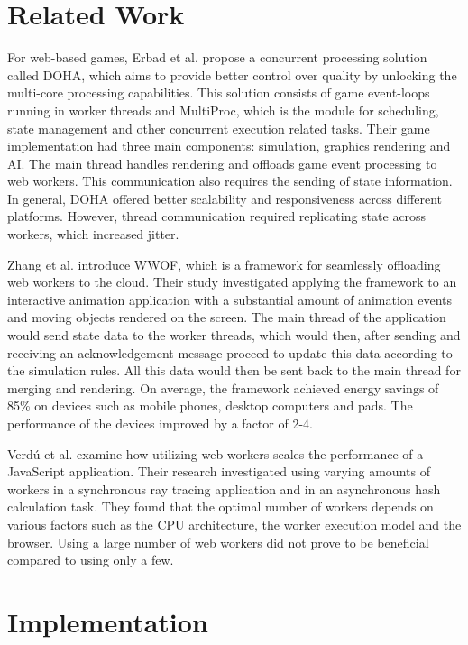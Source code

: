 \documentclass[conference]{IEEEtran}
\begin{document}
\section{Related Work}
\label{sec:soa}

For web-based games, Erbad et al. \cite{doha} propose a concurrent processing solution called DOHA, which aims to provide better control over quality by unlocking the 
multi-core processing capabilities. This solution consists of game event-loops running in worker threads and MultiProc, which is the module for scheduling, state 
management and other concurrent execution related tasks. Their game implementation had three main components: simulation, graphics rendering and AI. The main thread 
handles rendering and offloads game event processing to web workers. This communication also requires the sending of state information. In general, DOHA offered better 
scalability and responsiveness across different platforms. However, thread communication required replicating state across workers, which increased jitter.

Zhang et al. \cite{zhang} introduce WWOF, which is a framework for seamlessly offloading web workers to the cloud. Their study investigated applying the framework to an 
interactive animation application with a substantial amount of animation events and moving objects rendered on the screen. The main thread of the application would send 
state data to the worker threads, which would then, after sending and receiving an acknowledgement message proceed to update this data according to the simulation rules. 
All this data would then be sent back to the main thread for merging and rendering. On average, the framework achieved energy savings of 85\% on devices such as mobile 
phones, desktop computers and pads. The performance of the devices improved by a factor of 2-4.

Verdú et al. \cite{verdu} examine how utilizing web workers scales the performance of a JavaScript application. Their research investigated using varying amounts of 
workers in a synchronous ray tracing application and in an asynchronous hash calculation task. They found that the optimal number of workers depends on various factors 
such as the CPU architecture, the worker execution model and the browser. Using a large number of web workers did not prove to be beneficial compared to using only a few.

\section{Implementation}
\label{sec:implementation}
\end{document}
